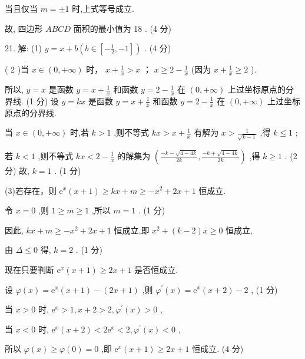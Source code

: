 \documentclass[10pt]{article}
\begin{document}
当且仅当 \(m =  \pm  1\) 时,上式等号成立.

故, 四边形 \({ABCD}\) 面积的最小值为 18 . (4 分)

21. 解: (1) \(y = x + b\left( {b \in  \left\lbrack  {-\frac{1}{2}, - 1}\right\rbrack  }\right)\) . (4 分)

( 2 )当 \(x \in  \left( {0, + \infty }\right)\) 时， \(x + \frac{1}{x} > x\) ； \(x \geq  2 - \frac{1}{x}\) (因为 \(x + \frac{1}{x} \geq  2\) ).

所以, \(y = x\) 是函数 \(y = x + \frac{1}{x}\) 和函数 \(y = 2 - \frac{1}{x}\) 在 \(\left( {0, + \infty }\right)\) 上过坐标原点的分界线. (1 分) 设 \(y = {kx}\) 是函数 \(y = x + \frac{1}{x}\) 和函数 \(y = 2 - \frac{1}{x}\) 在 \(\left( {0, + \infty }\right)\) 上过坐标原点的分界线.

当 \(x \in  \left( {0, + \infty }\right)\) 时,若 \(k > 1\) ,则不等式 \({kx} > x + \frac{1}{x}\) 有解为 \(x > \frac{1}{\sqrt{k - 1}}\) ,得 \(k \leq  1\) ;

若 \(k < 1\) ,则不等式 \({kx} < 2 - \frac{1}{x}\) 的解集为 \(\left( {\frac{-k - \sqrt{4 - {4k}}}{2k},\frac{-k + \sqrt{4 - {4k}}}{2k}}\right)\) ,得 \(k \geq  1\) . (2 分) 故, \(k = 1\) . (1 分)

(3)若存在，则 \({\mathrm{e}}^{x}\left( {x + 1}\right)  \geq  {kx} + m \geq   - {x}^{2} + {2x} + 1\) 恒成立.

令 \(x = 0\) ,则 \(1 \geq  m \geq  1\) ,所以 \(m = 1\) . (1 分)

因此, \({kx} + m \geq   - {x}^{2} + {2x} + 1\) 恒成立,即 \({x}^{2} + \left( {k - 2}\right) x \geq  0\) 恒成立,

由 \(\Delta  \leq  0\) 得, \(k = 2\) . (1 分)

现在只要判断 \({\mathrm{e}}^{x}\left( {x + 1}\right)  \geq  {2x} + 1\) 是否恒成立.

设 \(\varphi \left( x\right)  = {\mathrm{e}}^{x}\left( {x + 1}\right)  - \left( {{2x} + 1}\right)\) ,则 \({\varphi }^{\prime }\left( x\right)  = {\mathrm{e}}^{x}\left( {x + 2}\right)  - 2\) , (1 分)

当 \(x > 0\) 时, \({\mathrm{e}}^{x} > 1,x + 2 > 2,{\varphi }^{\prime }\left( x\right)  > 0\) ,

当 \(x < 0\) 时, \({\mathrm{e}}^{x}\left( {x + 2}\right)  < 2{\mathrm{e}}^{x} < 2,{\varphi }^{\prime }\left( x\right)  < 0\) ,

所以 \(\varphi \left( x\right)  \geq  \varphi \left( 0\right)  = 0\) ,即 \({\mathrm{e}}^{x}\left( {x + 1}\right)  \geq  {2x} + 1\) 恒成立. (4 分)
\end{document}
